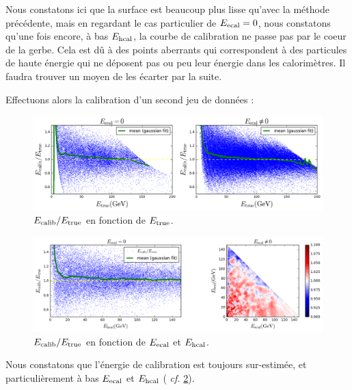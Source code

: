 \documentclass[11pt,a4paper]{article}
\begin{document}
Nous constatons ici que la surface est beaucoup plus lisse qu'avec la méthode précédente, mais en regardant le cas particulier de $E_{\rm ecal} = 0$, nous constatons qu'une fois encore, à bas $E_{\rm hcal}$, la courbe de calibration ne passe pas par le coeur de la gerbe. Cela est dû à des points aberrants qui correspondent à des particules de haute énergie qui ne déposent pas ou peu leur énergie dans les calorimètres. Il faudra trouver un moyen de les écarter par la suite.

Effectuons alors la calibration d'un second jeu de données : 
\begin{figure}[!h]
\begin{center}
\includegraphics[width=\textwidth]{images/pictures/testKNN/KNN_ecalib_over_etrue.png}
\caption{$E_{\rm calib}/E_{\rm true}$ en fonction de $E_{\rm true}$.}
\label{ecaliboveretrueKNN}
\end{center}
\end{figure}

\begin{figure}[!h]
\begin{center}
\includegraphics[width=\textwidth]{images/pictures/testKNN/KNN_ecalib_over_etrue_functionof_ecal_hcal.png}
\caption{$E_{\rm calib}/E_{\rm true}$ en fonction de $E_{\rm ecal}$ et $E_{\rm hcal}$.}
\label{ecaliboveretrueKNN_ecal_hcal}
\end{center}
\end{figure}

Nous constatons que l'énergie de calibration est toujours sur-estimée, et particulièrement à bas $E_{\rm ecal}$ et $E_{\rm hcal}$ ( \textit{cf.} \ref{ecaliboveretrueKNN_ecal_hcal}).
\end{document}
